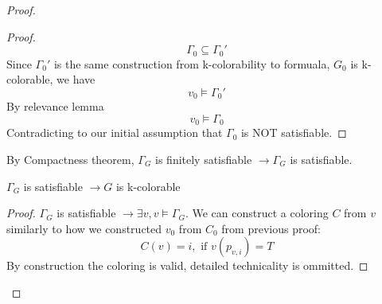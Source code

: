 \documentclass{article}
\newtheorem{lemma}[theorem]{Lemma}
\let\oldlemma\lemma
\let\endoldlemma\endlemma
\renewenvironment{lemma}
  {\begin{tcolorbox}[
      colback=green!8,
      colframe=green!50!black,
      boxrule=0.6pt,
      arc=2pt,
      left=6pt,right=6pt,top=4pt,bottom=4pt
    ]\oldlemma}
  {\endoldlemma\end{tcolorbox}}
\begin{document}
\begin{proof}
\begin{proof}
    \[\Gamma_0 \subseteq \Gamma_0'\] %
    Since $\Gamma_0'$ is the same construction from k-colorability to formuala, $G_0$ is k-colorable, we have 
    \[v_0 \models \Gamma_0'\]
    By relevance lemma
    \[v_0 \models \Gamma_0\]
    Contradicting to our initial assumption that $\Gamma_0$ is NOT satisfiable. 
    \end{proof}
By Compactness theorem, $\Gamma_G$ is finitely satisfiable $\rightarrow \Gamma_G$ is 
satisfiable.
    \begin{lemma}
        $\Gamma_G$ is satisfiable $\rightarrow G$ is k-colorable 
    \end{lemma}
    \begin{proof}
        $\Gamma_G$ is satisfiable $\rightarrow \exists v, v\models \Gamma_G$. We can construct a coloring $C$ from $v$ 
        similarly to how we constructed $v_0$ from $C_0$ from previous proof:
        \[C(v) = i, \text{ if } v(p_{v, i}) = T\]
        By construction the coloring is valid, detailed technicality is ommitted.
    \end{proof}
\end{proof}
\end{document}
